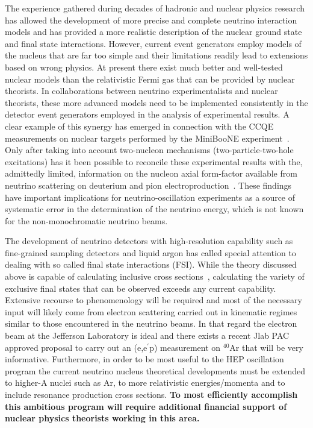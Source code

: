 The experience gathered during decades of hadronic and nuclear physics research has allowed the development of more precise and complete neutrino interaction models and has provided a more realistic description of the nuclear ground state and final state interactions. However, current event generators employ models of the nucleus that are far too simple and their limitations readily lead to extensions based on wrong physics. At present there exist much better and well-tested nuclear models than the relativistic Fermi gas that can be provided by nuclear theorists.  In collaborations between neutrino experimentalists and nuclear theorists, these more advanced models need to be implemented consistently in the detector event generators employed in the analysis of experimental results. 
A clear example of this synergy has emerged in connection with the CCQE measurements on nuclear targets performed by the MiniBooNE experiment~\cite{AguilarArevalo:2010zc}. Only after taking into account two-nucleon mechanisms (two-particle-two-hole excitations) has it been possible to reconcile these experimental results with the, admittedly limited, information on the nucleon axial form-factor available from neutrino scattering on deuterium and pion electroproduction~\cite{Amaro:2010sd,Nieves:2011yp,Martini:2011wp}.  These findings have important implications for neutrino-oscillation experiments as a source of systematic error in the determination of the neutrino energy, which is not known for the non-monochromatic neutrino beams.  

The development of neutrino detectors with high-resolution capability such as fine-grained sampling detectors and liquid argon has called special attention to dealing with so called final state interactions (FSI). While the theory discussed above is capable of calculating inclusive cross sections~\cite{Lovato:2014eva,1412.3081,Lovato:2015qka}, calculating the variety of exclusive final states that can be observed exceeds any current capability. Extensive recourse to phenomenology will be required and most of the necessary input will likely come from electron scattering carried out in kinematic regimes similar to those encountered in the neutrino beams. In that regard the electron beam at the Jefferson Laboratory is ideal and there exists a recent Jlab PAC approved proposal to carry out an (e,e$^\prime$p) measurement on $^{40}$Ar that will be very informative. 
Furthermore, in order to be most useful to the HEP oscillation program the current neutrino nucleus theoretical developments must be extended to higher-A nuclei such as Ar, to more relativistic energies/momenta and to include resonance production cross sections.  {\bf To most efficiently accomplish this ambitious program will require additional financial support of nuclear physics theorists working in this area.} 

